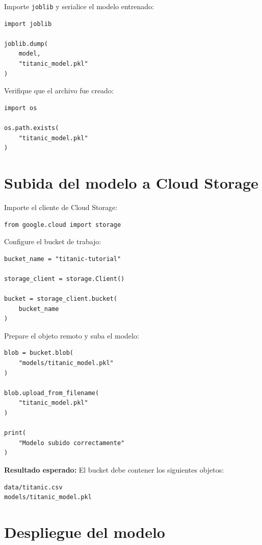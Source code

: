 \documentclass[
  coursetitle={Cómputo Nube y Tecnologías Emergentes},
  coursehours={96},
  coursedate={Verano 2026},
  doctype={Tutorial},
  otherlangs={english,french},
  authorname={Lázaro},
  authorsurname={Bustio-Martínez},
  authortitle={PhD},
  role={Profesor Investigador},
  email={lbustio@inaoe.mx},
  phone={5559504000},
  ext={7459},
  institution={Instituto Nacional de Astrofísica, Óptica y Electrónica (INAOE)},
  department={Maestría en Ciencias en Tecnologías de Seguridad},
  address={Luis Enrique Erro 1, Sta. Ma. Tonantzintla, San Andrés Cholula, CP 72840, Puebla, México},
  margin={0.5in}
]{../../lbustio_lecture_notes}
\begin{document}
Importe \texttt{joblib} y serialice el modelo entrenado:

\begin{lstlisting}
import joblib

joblib.dump(
    model,
    "titanic_model.pkl"
)
\end{lstlisting}

Verifique que el archivo fue creado:

\begin{lstlisting}
import os

os.path.exists(
    "titanic_model.pkl"
)
\end{lstlisting}

\section{Subida del modelo a Cloud Storage}

Importe el cliente de Cloud Storage:

\begin{lstlisting}
from google.cloud import storage
\end{lstlisting}

Configure el bucket de trabajo:

\begin{lstlisting}
bucket_name = "titanic-tutorial"

storage_client = storage.Client()

bucket = storage_client.bucket(
    bucket_name
)
\end{lstlisting}

Prepare el objeto remoto y suba el modelo:

\begin{lstlisting}
blob = bucket.blob(
    "models/titanic_model.pkl"
)

blob.upload_from_filename(
    "titanic_model.pkl"
)

print(
    "Modelo subido correctamente"
)
\end{lstlisting}

\textbf{Resultado esperado:} El bucket debe contener los siguientes objetos:

\begin{lstlisting}
data/titanic.csv
models/titanic_model.pkl
\end{lstlisting}

\section{Despliegue del modelo}
\end{document}
